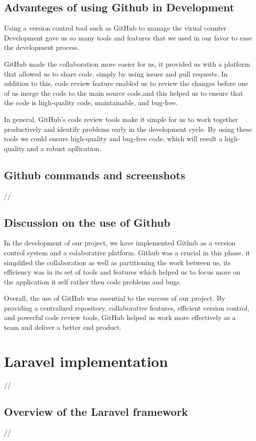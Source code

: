 \subsection{Advanteges of using Github in Development}
Using a version control tool such as GitHub to manage the virual counter Development gave us so many tools and features that we used in our favor to ease the development process.

\medskip GitHub made the collaboration more easier for us, it provided us with a platform that allowed us to share code, simply by using issues and pull requests. In addition to this, code review feature enabled us to review the changes before one of us merge the code to the main source code,and this helped us to ensure that the code is high-quality code, maintainable, and bug-free.

In general, GitHub's code review tools make it simple for us to work together productively and identify problems early in the development cycle. By using these tools we could ensure high-quality and bug-free code, which will result a high-quality and a robust apllication.
\subsection{Github commands and screenshots  }
//
\subsection{Discussion on the use of Github}
In the development of our project, we have implemented Github as a version control system and a colaborative platform. Github was a crucial in this phase, it simplified the collaboration as well as partitioning the work between us, its efficiency was in its set of tools and features which helped us to focus more on the application it self rather then code problems and bugs. 

Overall, the use of GitHub was essential to the success of our project. By providing a centralized repository, collaborative features, efficient version control, and powerful code review tools, GitHub helped us work more effectively as a team and deliver a better end product.
\section {Laravel implementation}
//
\subsection {Overview of the Laravel framework}
//
